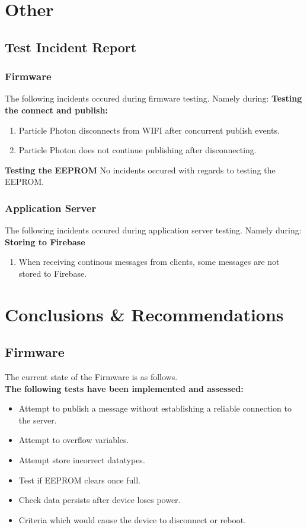 \documentclass[a4paper,10pt]{article}
\begin{document}
	\section{Other}
		\subsection{Test Incident Report}
		\subsubsection{Firmware}
		The following incidents occured during firmware testing. Namely during:
		\textbf{Testing the connect and publish:}
		\begin{enumerate}
			\item Particle Photon disconnects from WIFI after concurrent publish events.
			\item Particle Photon does not continue publishing after disconnecting.
		\end{enumerate}
		\textbf{Testing the EEPROM}
		No incidents occured with regards to testing the EEPROM.
		\subsubsection{Application Server}
		The following incidents occured during application server testing. Namely during:
		\textbf{Storing to Firebase}
		\begin{enumerate}
			\item When receiving continous messages from clients, some messages are not stored to Firebase.
		\end{enumerate}
	
	\section{Conclusions \& Recommendations}
	\subsection{Firmware}
	The current state of the Firmware is as follows.
	\textbf{\\The following tests have been implemented and assessed:}
	\begin{itemize}
		\item Attempt to publish a message without establishing a reliable connection to the server.
		\item Attempt to overflow variables.
		\item Attempt store incorrect datatypes.
		\item Test if EEPROM clears once full.
		\item Check data persists after device loses power.
		\item Criteria which would cause the device to disconnect or reboot.
	\end{itemize}
	
\end{document}
